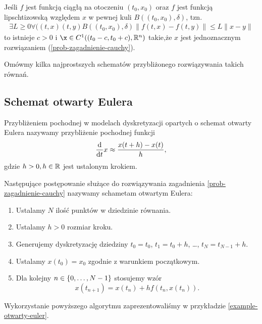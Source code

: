\documentclass[12pt,a4paper]{report}
\begin{document}
\begin{example}
\begin{theorem}
Jeśli $f$ jest funkcją ciągłą na otoczeniu $(t_{0},x_{0})$ oraz $f$ jest funkcją lipschtizowską względem $x$ w pewnej kuli $B((t_{0},x_{0}),\delta)$, tzn.
\begin{align*}
\exists L\geq 0 \forall ((t,x)(t,y) B((t_{0},x_{0}),\delta)  \parallel f(t,x) - f(t,y) \parallel \leq L\parallel x-y \parallel 
\end{align*} 
\newline to istnieje $ c> 0 $ i $\x \in C^{1}((t_0 - c, t_0 + c ), \setR^{n}) $ takie,że $x$ jest jednoznacznym rozwiązaniem (\ref{prob-zagadnienie-cauchy}).
\end{theorem}


Omówmy kilka najprostszych schematów przybliżonego rozwiązywania takich równań.

\subsection{Schemat otwarty Eulera}

\begin{definition}
Przybliżeniem pochodnej w modelach dyskretyzacji opartych o schemat otwarty Eulera nazywamy przybliżenie pochodnej funkcji
$$
\frac{\mathrm{d} {} }{\mathrm{d}{t}}x \approx \frac{x(t+h) - x(t)}{h},
$$
gdzie $h >0, h \in \mathbb{R} $ jest ustalonym krokiem. 
\end{definition}

\begin{algorithm}
Następujące postępowanie służące do rozwiązywania zagadnienia \ref{prob-zagadnienie-cauchy} nazywamy schametam otwartym Eulera:
\begin{enumerate}
\item Ustalamy $N$ ilość punktów w dziedzinie równania. 
\item Ustalamy $h>0$ rozmiar kroku.
\item Generujemy dyskretyzację dziedziny $t_0 = t_0$, $t_1 = t_0 + h$, \ldots, $t_N = t_{N-1}+h$. 
\item Ustalamy $x(t_0) = x_0$ zgodnie z warunkiem początkowym.
\item Dla kolejny $n \in \left\lbrace {0, \ldots, N-1} \right\rbrace$ stosujemy wzór
$$
x(t_{n+1}) = x(t_n) + h f(t_n, x(t_n)).
$$
\end{enumerate}
\end{algorithm}

Wykorzystanie powyższego algorytmu zaprezentowaliśmy w przykładzie \ref{example-otwarty-euler}.


\end{example}
\end{document}
